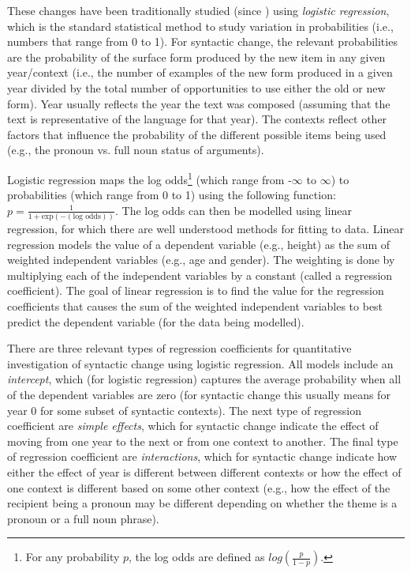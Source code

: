 	These changes have been traditionally studied (since \citealt{Kroch.1989}) using \textit{logistic regression}, which is the standard statistical method to study variation in probabilities (i.e., numbers that range from 0 to 1). For syntactic change, the relevant probabilities are the probability of the surface form produced by the new item in any given year/context (i.e., the number of examples of the new form produced in a given year divided by the total number of opportunities to use either the old or new form). Year usually reflects the year the text was composed (assuming that the text is representative of the language for that year). The contexts reflect other factors that influence the probability of the different possible items being used (e.g., the pronoun vs. full noun status of arguments).

	Logistic regression maps the log odds\footnote{For any probability $p$, the log odds are defined as $log(\frac{p}{1-p})$.} (which range from -$\infty$ to $\infty$) to probabilities (which range from 0 to 1) using the following function: $p=\frac{1}{1+\text{exp}(-(\text{log odds}))}$. The log odds can then be modelled using linear regression, for which there are well understood methods for fitting to data. Linear regression models the value of a dependent variable (e.g., height) as the sum of weighted independent variables (e.g., age and gender). The weighting is done by multiplying each of the independent variables by a constant (called a regression coefficient). The goal of linear regression is to find the value for the regression coefficients that causes the sum of the weighted independent variables to best predict the dependent variable (for the data being modelled).

	There are three relevant types of regression coefficients for quantitative investigation of syntactic change using logistic regression. All models include an \textit{intercept}, which (for logistic regression) captures the average probability when all of the dependent variables are zero (for syntactic change this usually means for year 0 for some subset of syntactic contexts). The next type of regression coefficient are \textit{simple effects}, which for syntactic change indicate the effect of moving from one year to the next or from one context to another. The final type of regression coefficient are \textit{interactions}, which for syntactic change indicate how either the effect of year is different between different contexts or how the effect of one context is different based on some other context (e.g., how the effect of the recipient being a pronoun may be different depending on whether the theme is a pronoun or a full noun phrase).

